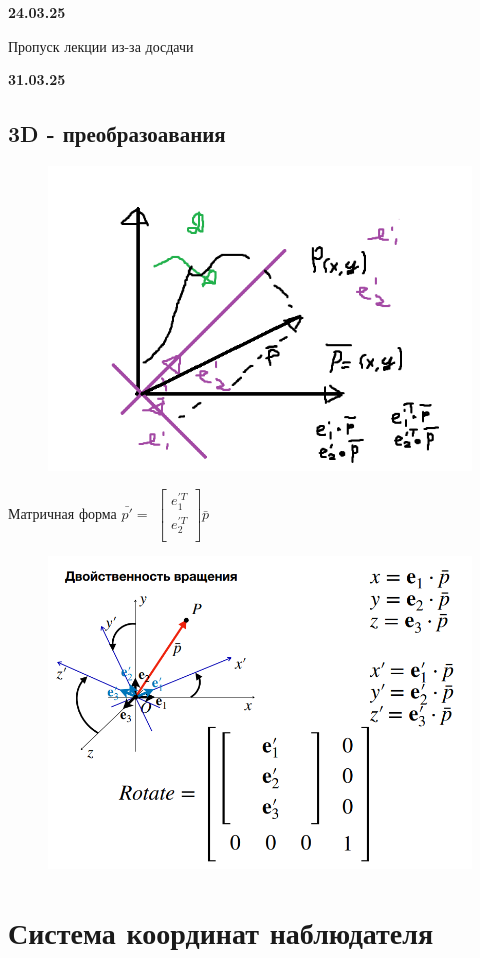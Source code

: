 \documentclass{article}
\begin{document}
\textbf{24.03.25}

Пропуск лекции из-за досдачи

\textbf{31.03.25}

\subsection{3D - преобразоавания}

\begin{figure} [H]
    \includegraphics[width=0.70\linewidth]{тра.png}
\end{figure}

Матричная форма $\bar{p'}=$
$\begin{bmatrix}
    e^{'T}_{1} \\
    e^{'T}_{2} \\
\end{bmatrix}
\bar{p}
$

\begin{figure} [H]
    \includegraphics[width=0.70\linewidth]{Снимок экрана 2025-03-31 123501.png}
\end{figure}


\section{Система координат наблюдателя}
\end{document}
